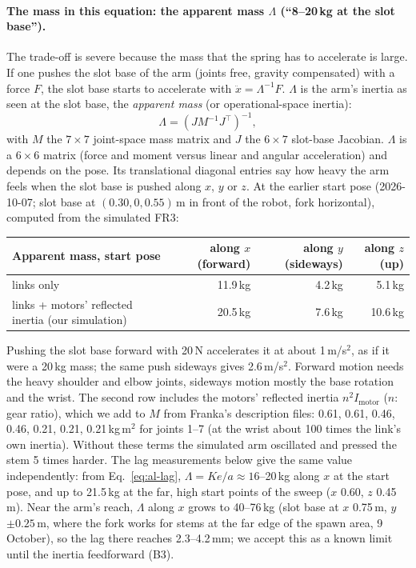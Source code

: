 \paragraph{The mass in this equation: the apparent mass $\Lambda$ (``8--20\,kg at the slot base'').} The trade-off
is severe because the mass that the spring has to accelerate is large. If one pushes the slot base of
the arm (joints free, gravity compensated) with a force $F$, the slot base starts to accelerate with $\ddot x = \Lambda^{-1}
F$. $\Lambda$ is the arm's inertia as seen at the slot base, the \emph{apparent mass} (or operational-space inertia):
\begin{equation}
  \Lambda = \left(J M^{-1} J^\top\right)^{-1},
  \label{eq:al-lambda}
\end{equation}
with $M$ the $7\times7$ joint-space mass matrix and $J$ the $6\times7$ slot-base Jacobian. $\Lambda$ is a $6\times6$
matrix (force and moment versus linear and angular acceleration) and depends on the pose. Its translational
diagonal entries say how heavy the arm feels when the slot base is pushed along $x$, $y$ or $z$. At the earlier start pose
(2026-10-07; slot base at $(0.30, 0, 0.55)$\,m in front of the robot, fork horizontal), computed from the simulated FR3:
\begin{center}
{\renewcommand{\arraystretch}{1.15}
\begin{tabular}{lrrr}
  \toprule
  Apparent mass, start pose & along $x$ (forward) & along $y$ (sideways) & along $z$ (up) \\
  \midrule
  links only & 11.9\,kg & 4.2\,kg & 5.1\,kg \\
  links + motors' reflected inertia (our simulation) & 20.5\,kg & 7.6\,kg & 10.6\,kg \\
  \bottomrule
\end{tabular}}
\end{center}
Pushing the slot base forward with 20\,N accelerates it at about 1\,m/s$^2$, as if it were a 20\,kg mass; the same push
sideways gives 2.6\,m/s$^2$. Forward motion needs the heavy shoulder and elbow joints, sideways motion mostly the
base rotation and the wrist. The second row includes the motors' reflected inertia $n^2 I_\text{motor}$ ($n$: gear
ratio), which we add to $M$ from Franka's description files: 0.61, 0.61, 0.46, 0.46, 0.21, 0.21, 0.21\,kg\,m$^2$ for
joints 1--7 (at the wrist about 100 times the link's own inertia). Without these terms the simulated arm oscillated
and pressed the stem 5 times harder. The lag measurements below give the same value independently: from
Eq.~\eqref{eq:al-lag}, $\Lambda = K e / a \approx 16$--20\,kg along $x$ at the start pose, and up to 21.5\,kg
at the far, high start points of the sweep ($x$ 0.60, $z$ 0.45\,m).
Near the arm's reach, $\Lambda$ along $x$ grows to 40--76\,kg (slot base at $x$ 0.75\,m, $y$ $\pm0.25$\,m, where the
fork works for stems at the far edge of the spawn area, 9 October), so the lag there reaches 2.3--4.2\,mm; we accept
this as a known limit until the inertia feedforward (B3).

